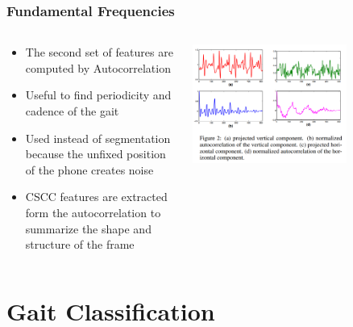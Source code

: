 \documentclass{beamer}
\begin{document}
\begin{frame}
\frametitle{Fundamental Frequencies}
 \begin{columns}
  \begin{column}{.5\textwidth}
  \begin{itemize}
		\item The second set of features are computed by Autocorrelation 
		\item Useful to find periodicity and cadence of the gait
		\item Used instead of segmentation because the unfixed position of the phone creates noise
		\item CSCC features are extracted form the autocorrelation to summarize the shape and structure of the frame
  \end{itemize}
  \end{column}
  \begin{column}{0.7\textwidth}
   \includegraphics[width=0.7\textwidth]{Illustrations/autocorrelation.png}
       \\
  \end{column}
  \end{columns}  
  
\end{frame}
\section[Gait Analysis]{Gait Classification}
\end{document}
